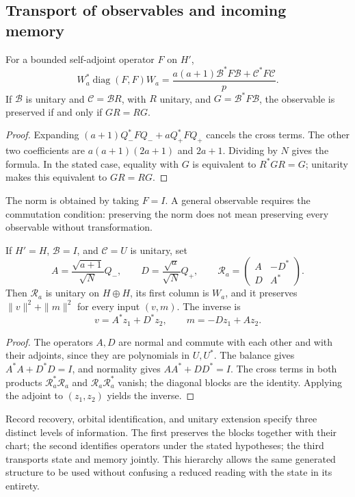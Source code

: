 \subsection{Transport of observables and incoming memory}
\label{subsec:acoplamiento-lectores}

\begin{theorem}
\label{thm:acoplamiento-lector}
For a bounded self-adjoint operator \(F\) on \(H'\),
\[
 W_a^*\operatorname{diag}(F,F)W_a
 =\frac{a(a+1)\mathcal B^*F\mathcal B+\mathcal C^*F\mathcal C}{p}.
\]
If \(\mathcal B\) is unitary and \(\mathcal C=\mathcal BR\), with
\(R\) unitary, and \(G=\mathcal B^*F\mathcal B\), the observable is
preserved if and only if \(GR=RG\).
\end{theorem}
\begin{proof}
Expanding \((a+1)Q_-^*FQ_-+aQ_+^*FQ_+\) cancels the cross terms.
The other two coefficients are
\(a(a+1)(2a+1)\) and \(2a+1\). Dividing by \(N\) gives the formula.
In the stated case, equality with \(G\) is equivalent to \(R^*GR=G\);
unitarity makes this equivalent to \(GR=RG\).
\end{proof}

The norm is obtained by taking \(F=I\). A general observable requires
the commutation condition: preserving the norm does not mean preserving
every observable without transformation.

\begin{theorem}
\label{thm:acoplamiento-memoria}
If \(H'=H\), \(\mathcal B=I\), and \(\mathcal C=U\) is unitary, set
\[
 A=\frac{\sqrt{a+1}}{\sqrt N}Q_-,\qquad
 D=\frac{\sqrt a}{\sqrt N}Q_+,\qquad
 \mathscr R_a=\begin{pmatrix}A&-D^*\\D&A^*\end{pmatrix}.
\]
Then \(\mathscr R_a\) is unitary on \(H\oplus H\), its first
column is \(W_a\), and it preserves \(\|v\|^2+\|m\|^2\) for every
input \((v,m)\). The inverse is
\[
 v=A^*z_1+D^*z_2,\qquad m=-Dz_1+Az_2.
\]
\end{theorem}
\begin{proof}
The operators \(A,D\) are normal and commute with each other and with their
adjoints, since they are polynomials in \(U,U^*\). The balance gives
\(A^*A+D^*D=I\), and normality gives \(AA^*+DD^*=I\).
The cross terms in both products
\(\mathscr R_a^*\mathscr R_a\) and \(\mathscr R_a\mathscr R_a^*\)
vanish; the diagonal blocks are the identity. Applying the adjoint to
\((z_1,z_2)\) yields the inverse.
\end{proof}

Record recovery, orbital identification, and unitary extension specify
three distinct levels of information. The first preserves the blocks
together with their chart; the second identifies operators under the
stated hypotheses; the third transports state and memory jointly.
This hierarchy allows the same generated structure to be used without
confusing a reduced reading with the state in its entirety.
